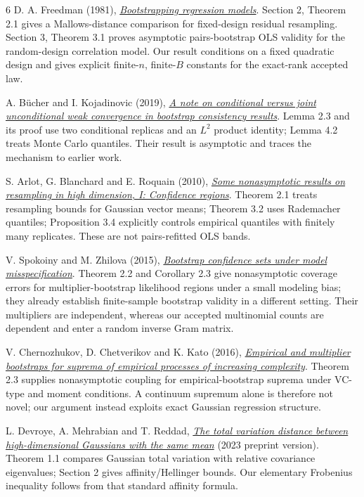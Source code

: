 \documentclass[11pt]{article}
\begin{document}
{\small
\begin{thebibliography}{6}
D. A. Freedman (1981),
\href{https://doi.org/10.1214/aos/1176345638}{\emph{Bootstrapping regression models}}.
Section 2, Theorem 2.1 gives a Mallows-distance comparison for fixed-design
residual resampling. Section 3, Theorem 3.1 proves asymptotic pairs-bootstrap
OLS validity for the random-design correlation model. Our result conditions
on a fixed quadratic design and gives explicit finite-$n$, finite-$B$
constants for the exact-rank accepted law.

A. B\"ucher and I. Kojadinovic (2019),
\href{https://arxiv.org/abs/1706.01031}{\emph{A note on conditional versus joint
unconditional weak convergence in bootstrap consistency results}}.
Lemma 2.3 and its proof use two conditional replicas and an $L^2$ product
identity; Lemma 4.2 treats Monte Carlo quantiles. Their result is asymptotic
and traces the mechanism to earlier work.

S. Arlot, G. Blanchard and E. Roquain (2010),
\href{https://arxiv.org/abs/0712.0775}{\emph{Some nonasymptotic results on
resampling in high dimension, I: Confidence regions}}.
Theorem 2.1 treats resampling bounds for Gaussian vector means; Theorem 3.2
uses Rademacher quantiles; Proposition 3.4 explicitly controls empirical
quantiles with finitely many replicates. These are not pairs-refitted OLS bands.

V. Spokoiny and M. Zhilova (2015),
\href{https://arxiv.org/abs/1410.0347}{\emph{Bootstrap confidence sets under model
misspecification}}.
Theorem 2.2 and Corollary 2.3 give nonasymptotic coverage errors for
multiplier-bootstrap likelihood regions under a small modeling bias;
they already establish finite-sample bootstrap validity in a different setting.
Their multipliers are independent, whereas our accepted multinomial counts
are dependent and enter a random inverse Gram matrix.

V. Chernozhukov, D. Chetverikov and K. Kato (2016),
\href{https://arxiv.org/abs/1502.00352}{\emph{Empirical and multiplier bootstraps
for suprema of empirical processes of increasing complexity}}.
Theorem 2.3 supplies nonasymptotic coupling for empirical-bootstrap suprema
under VC-type and moment conditions. A continuum supremum alone is therefore
not novel; our argument instead exploits exact Gaussian regression structure.

L. Devroye, A. Mehrabian and T. Reddad,
\href{https://arxiv.org/abs/1810.08693}{\emph{The total variation distance between
high-dimensional Gaussians with the same mean}} (2023 preprint version).
Theorem 1.1 compares Gaussian total variation with relative covariance
eigenvalues; Section 2 gives affinity/Hellinger bounds. Our elementary
Frobenius inequality follows from that standard affinity formula.
\end{thebibliography}
}
\end{document}
